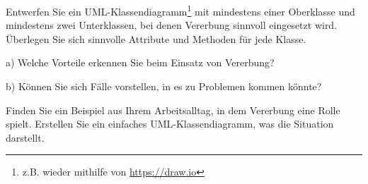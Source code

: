 \documentclass[11pt, a4paper, oneside]{article}
\begin{document}
	Entwerfen Sie ein UML-Klassendiagramm\footnote{z.B. wieder mithilfe von \url{https://draw.io}} mit mindestens einer Oberklasse und mindestens zwei Unterklassen, bei denen Vererbung sinnvoll eingesetzt wird.
	Überlegen Sie sich sinnvolle Attribute und Methoden für jede Klasse.
	
	\boxarea[17cm]
	
	
	a) Welche Vorteile erkennen Sie beim Einsatz von Vererbung?
	
	\lines[3cm]
	
	b) Können Sie sich Fälle vorstellen, in es zu Problemen kommen könnte?
	
	\lines[3cm]
	
	
	Finden Sie ein Beispiel aus Ihrem Arbeitsalltag, in dem Vererbung eine Rolle spielt.
	Erstellen Sie ein einfaches UML-Klassendiagramm, was die Situation darstellt.
	
	\boxarea[8cm]
	
\end{document}
